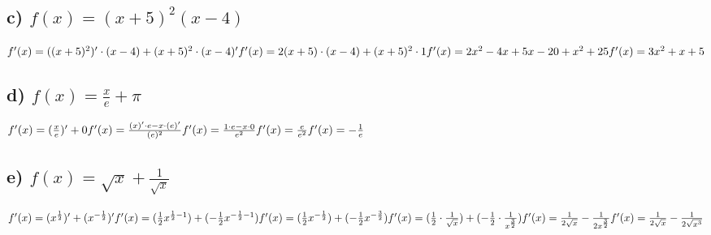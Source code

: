 \documentclass{article}
\begin{document}
\subsection{c) $f(x) = (x+5)^2(x-4)$}
$
f'(x) = ((x+5)^2)' \cdot (x-4) + (x+5)^2 \cdot (x-4)'
\\
\\
f'(x) = 2(x+5) \cdot (x-4) + (x+5)^2 \cdot 1
\\
\\
f'(x) = 2x^2 - 4x + 5x - 20 + x^2 + 25
\\
\\
f'(x) = 3x^2 + x + 5
$

\pagebreak

\subsection{d) $f(x) = \frac{x}{e} + \pi $}
$
f'(x) = (\frac{x}{e})' + 0
\\
\\
f'(x) = \frac{(x)' \cdot e - x \cdot (e)'}{(e)^2}
\\
\\
f'(x) = \frac{1 \cdot e - x \cdot 0}{e^2}
\\
\\
f'(x) = \frac{e}{e^2}
\\
\\
f'(x) = - \frac{1}{e}
$

\subsection{e) $f(x) = \sqrt{x} + \frac{1}{\sqrt{x}}$}
$
f'(x) = (x^{\frac{1}{2}})' + (x^{-\frac{1}{2}})'
\\
\\
f'(x) = (\frac{1}{2}x^{\frac{1}{2}-1}) + (-\frac{1}{2}x^{-\frac{1}{2}-1})
\\
\\
f'(x) = (\frac{1}{2}x^{-\frac{1}{2}}) + (-\frac{1}{2}x^{-\frac{3}{2}})
\\
\\
f'(x) = (\frac{1}{2} \cdot \frac{1}{\sqrt{x}}) + (-\frac{1}{2} \cdot \frac{1}{x^{\frac{3}{2}}})
\\
\\
f'(x) = \frac{1}{2\sqrt{x}} - \frac{1}{2x^{\frac{3}{2}}}
\\
\\
f'(x) = \frac{1}{2\sqrt{x}} - \frac{1}{2\sqrt{x^3}}
$
\end{document}
